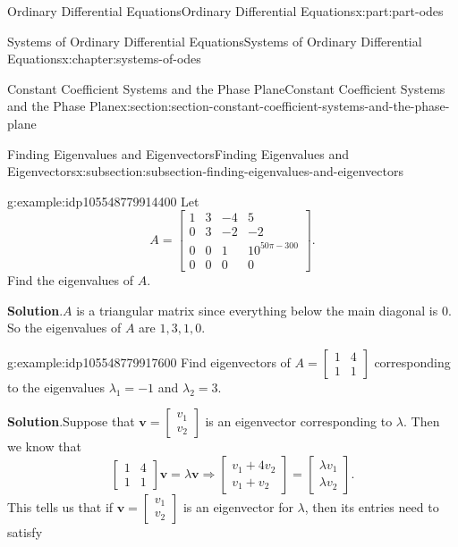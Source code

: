 \documentclass[oneside,10pt,]{book}
\newcommand{\blocktitlefont}{\relax}
\numberwithin{equation}{part}
\renewcommand{\vec}[1]{\mathbf{#1}}
\newcommand{\amp}{&}
\begin{document}
\begin{partptx}{Ordinary Differential Equations}{}{Ordinary Differential Equations}{}{}{x:part:part-odes}
\begin{chapterptx}{Systems of Ordinary Differential Equations}{}{Systems of Ordinary Differential Equations}{}{}{x:chapter:systems-of-odes}
\begin{sectionptx}{Constant Coefficient Systems and the Phase Plane}{}{Constant Coefficient Systems and the Phase Plane}{}{}{x:section:section-constant-coefficient-systems-and-the-phase-plane}
\begin{subsectionptx}{Finding Eigenvalues and Eigenvectors}{}{Finding Eigenvalues and Eigenvectors}{}{}{x:subsection:subsection-finding-eigenvalues-and-eigenvectors}
\begin{example}{}{g:example:idp105548779914400}
Let%
\begin{equation*}
A = \begin{bmatrix}1 \amp  3 \amp  -4 \amp  5 \\ 0 \amp  3 \amp  -2 \amp  -2 \\ 0 \amp  0 \amp  1 \amp  10^{50\pi-300} \\ 0 \amp  0 \amp  0 \amp  0\end{bmatrix}.
\end{equation*}
Find the eigenvalues of \(A\).%
\par\smallskip%
\noindent\textbf{\blocktitlefont Solution}.\hypertarget{g:solution:idp105548779915680}{}\quad{}\(A\) is a triangular matrix since everything below the main diagonal is \(0\). So the eigenvalues of \(A\) are \(1,3,1,0\).%
\end{example}
\begin{example}{}{g:example:idp105548779917600}%
Find eigenvectors of \(A = \begin{bmatrix}1 \amp  4 \\ 1 \amp  1\end{bmatrix}\) corresponding to the eigenvalues \(\lambda_{1} = -1\) and \(\lambda_{2} = 3\).%
\par\smallskip%
\noindent\textbf{\blocktitlefont Solution}.\hypertarget{g:solution:idp105548779919264}{}\quad{}Suppose that \(\vec{v} = \begin{bmatrix} v_{1} \\ v_{2} \end{bmatrix}\) is an eigenvector corresponding to \(\lambda\). Then we know that%
\begin{equation*}
\begin{bmatrix}1 \amp  4 \\ 1 \amp  1\end{bmatrix}\vec{v} = \lambda\vec{v} \Rightarrow \begin{bmatrix}v_{1}+4v_{2} \\ v_{1} + v_{2}\end{bmatrix} = \begin{bmatrix} \lambda v_{1} \\ \lambda v_{2} \end{bmatrix}.
\end{equation*}
This tells us that if \(\vec{v} = \begin{bmatrix}v_{1} \\ v_{2} \end{bmatrix}\) is an eigenvector for \(\lambda\), then its entries need to satisfy%
\begin{align}

\end{align}
\end{example}
\end{subsectionptx}
\end{sectionptx}
\end{chapterptx}
\end{partptx}
\end{document}
